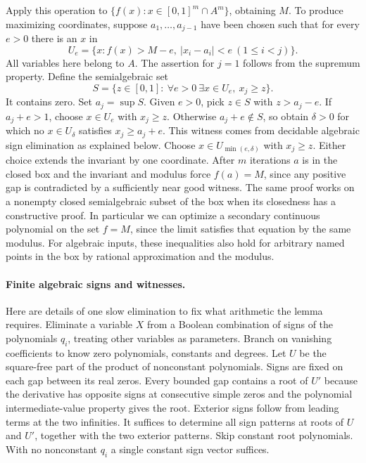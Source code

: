 \documentclass[10pt,letterpaper]{article}
\begin{document}
Apply this operation to $\{f(x):x\in[0,1]^m\cap A^m\}$, obtaining $M$.
To produce maximizing coordinates, suppose $a_1,\dots,a_{j-1}$ have
been chosen such that for every $e>0$ there is an $x$ in
\[
 U_e=\{x:f(x)>M-e,\ |x_i-a_i|<e\ (1\le i<j)\}.
\]
All variables here belong to $A$. The assertion for $j=1$ follows
from the supremum property. Define the semialgebraic set
\[
 S=\{z\in[0,1]:\ \forall e>0\ \exists x\in U_e,\ x_j\ge z\}.
\]
It contains zero. Set $a_j=\sup S$. Given $e>0$, pick $z\in S$ with
$z>a_j-e$. If $a_j+e>1$, choose $x\in U_e$ with $x_j\ge z$.
Otherwise $a_j+e\notin S$, so obtain $\delta>0$ for which no
$x\in U_\delta$ satisfies $x_j\ge a_j+e$. This witness comes from
decidable algebraic sign elimination as explained below. Choose
$x\in U_{\min(e,\delta)}$ with $x_j\ge z$. Either choice extends the
invariant by one coordinate. After $m$ iterations $a$ is in the closed
box and the invariant and modulus force $f(a)=M$, since any positive gap
is contradicted by a sufficiently near good witness. The same proof
works on a nonempty closed semialgebraic subset of the box when its
closedness has a constructive proof. In particular we can optimize
a secondary continuous polynomial on the set $f=M$, since the limit
satisfies that equation by the same modulus. For algebraic inputs,
these inequalities also hold for arbitrary named points in the box
by rational approximation and the modulus.

\paragraph{Finite algebraic signs and witnesses.}
Here are details of one slow elimination to fix what arithmetic the
lemma requires. Eliminate a variable $X$ from a Boolean combination
of signs of the polynomials $q_i$, treating other variables as
parameters. Branch on vanishing coefficients to know zero
polynomials, constants and degrees. Let $U$ be the square-free
part of the product of nonconstant polynomials. Signs are fixed on
each gap between its real zeros. Every bounded gap contains a root
of $U'$ because the derivative has opposite signs at consecutive simple
zeros and the polynomial intermediate-value property gives the root.
Exterior signs follow from leading terms at the two infinities.
It suffices to determine all sign patterns at roots of $U$ and $U'$,
together with the two exterior patterns. Skip constant root polynomials.
With no nonconstant $q_i$ a single constant sign vector suffices.
\end{document}
